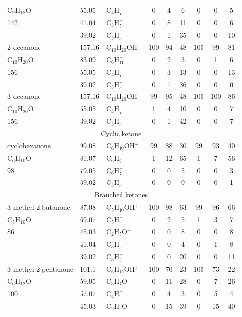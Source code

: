 {\begin{longtable}[c]{lllcccccc}
C$_9$H$_{18}$O & 55.05 & C$_4$H$_{7}^+$ & 0 & 4 & 6 & 0 & 0 & 5 \\
142 & 41.04 & C$_3$H$_{5}^+$ & 0 & 8 & 11 & 0 & 0 & 6 \\
 & 39.02 & C$_3$H$_{3}^+$ & 0 & 1 & 35 & 0 & 0 & 10 \\ \hline
2-decanone & 157.16 & C$_{10}$H$_{20}$OH$^+$ & 100 & 94 & 48 & 100 & 99 & 81 \\
C$_{10}$H$_{20}$O & 83.09 & C$_6$H$_{11}^+$ & 0 & 2 & 3 & 0 & 1 & 6 \\
156 & 55.05 & C$_4$H$_{7}^+$ & 0 & 3 & 13 & 0 & 0 & 13 \\
 & 39.02 & C$_3$H$_{3}^+$ & 0 & 1 & 36 & 0 & 0 & 0 \\ \hline
3-decanone & 157.16 & C$_{10}$H$_{20}$OH$^+$ & 99 & 95 & 48 & 100 & 100 & 86 \\
C$_{10}$H$_{20}$O & 55.05 & C$_4$H$_{7}^+$ & 1 & 4 & 10 & 0 & 0 & 7 \\
156 & 39.02 & C$_3$H$_{3}^+$ & 0 & 1 & 42 & 0 & 0 & 7 \\ \hline
\multicolumn{9}{c}{Cyclic ketone} \\ \hline
cyclohexanone & 99.08 & C$_6$H$_{10}$OH$^+$ & 99 & 88 & 30 & 99 & 93 & 40 \\
C$_6$H$_{10}$O & 81.07 & C$_6$H$_{9}^+$ & 1 & 12 & 65 & 1 & 7 & 56 \\
98 & 79.05 & C$_6$H$_{7}^+$ & 0 & 0 & 5 & 0 & 0 & 3 \\
 & 39.02 & C$_3$H$_{3}^+$ & 0 & 0 & 0 & 0 & 0 & 1 \\ \hline
\multicolumn{9}{c}{Branched ketones} \\ \hline
3-methyl-2-butanone & 87.08 & C$_5$H$_{10}$OH$^+$ & 100 & 98 & 63 & 99 & 96 & 66 \\
C$_5$H$_{10}$O & 69.07 & C$_5$H$_{9}^+$ & 0 & 2 & 5 & 1 & 3 & 7 \\
86 & 45.03 & C$_2$H$_{5}$O$^+$ & 0 & 0 & 8 & 0 & 0 & 8 \\
 & 41.04 & C$_3$H$_{5}^+$ & 0 & 0 & 4 & 0 & 1 & 8 \\
 & 39.02 & C$_3$H$_{3}^+$ & 0 & 0 & 20 & 0 & 0 & 11 \\ \hline
3-methyl-2-pentanone & 101.1 & C$_6$H$_{12}$OH$^+$ & 100 & 70 & 23 & 100 & 73 & 22 \\
C$_6$H$_{12}$O & 59.05 & C$_3$H$_{7}$O$^+$ & 0 & 11 & 28 & 0 & 7 & 26 \\
100 & 57.07 & C$_4$H$_{9}^+$ & 0 & 4 & 3 & 0 & 5 & 4 \\
 & 45.03 & C$_2$H$_{5}$O$^+$ & 0 & 15 & 39 & 0 & 15 & 40 \\

\end{longtable}}

